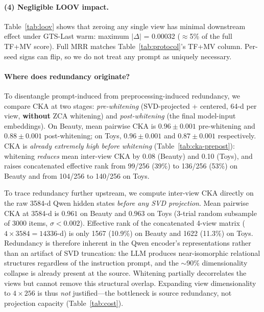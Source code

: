 \documentclass[sigconf,natbib=true,anonymous]{acmart}
\newcommand{\tfmv}{\textsc{TF+MV}\xspace}
\begin{document}
\paragraph{(4) Negligible LOOV impact.}
Table~\ref{tab:loov} shows that zeroing any single view has minimal downstream effect under GTS-Last warm: maximum $|\Delta|$ = 0.00032 ($\approx$5\% of the full \tfmv score).
Full MRR matches Table~\ref{tab:protocol}'s \tfmv column.
Per-seed signs can flip, so we do not treat any prompt as uniquely necessary.

\paragraph{Where does redundancy originate?}
To disentangle prompt-induced from preprocessing-induced redundancy, we compare CKA at two stages: \emph{pre-whitening} (SVD-projected + centered, 64-d per view, \textbf{without} ZCA whitening) and \emph{post-whitening} (the final model-input embeddings).
On Beauty, mean pairwise CKA is $0.96\pm0.001$ pre-whitening and $0.88\pm0.001$ post-whitening; on Toys, $0.96\pm0.001$ and $0.87\pm0.001$ respectively.
CKA is \emph{already extremely high before whitening} (Table~\ref{tab:cka-prepost}): whitening \emph{reduces} mean inter-view CKA by 0.08 (Beauty) and 0.10 (Toys), and raises concatenated effective rank from 99/256 (39\%) to 136/256 (53\%) on Beauty and from 104/256 to 140/256 on Toys.

To trace redundancy further upstream, we compute inter-view CKA directly on the raw 3584-d Qwen hidden states \emph{before any SVD projection}.
Mean pairwise CKA at 3584-d is $0.961$ on Beauty and $0.963$ on Toys (3-trial random subsample of 3000 items, $\sigma < 0.002$).
Effective rank of the concatenated 4-view matrix ($4\times 3584 = 14336$-d) is only 1567 (10.9\%) on Beauty and 1622 (11.3\%) on Toys.
Redundancy is therefore inherent in the Qwen encoder's representations rather than an artifact of SVD truncation: the LLM produces near-isomorphic relational structures regardless of the instruction prompt, and the $\sim$90\% dimensionality collapse is already present at the source.
Whitening partially decorrelates the views but cannot remove this structural overlap.
Expanding view dimensionality to $4\times256$ is thus \emph{not} justified---the bottleneck is source redundancy, not projection capacity (Table~\ref{tab:cost}).
\end{document}
